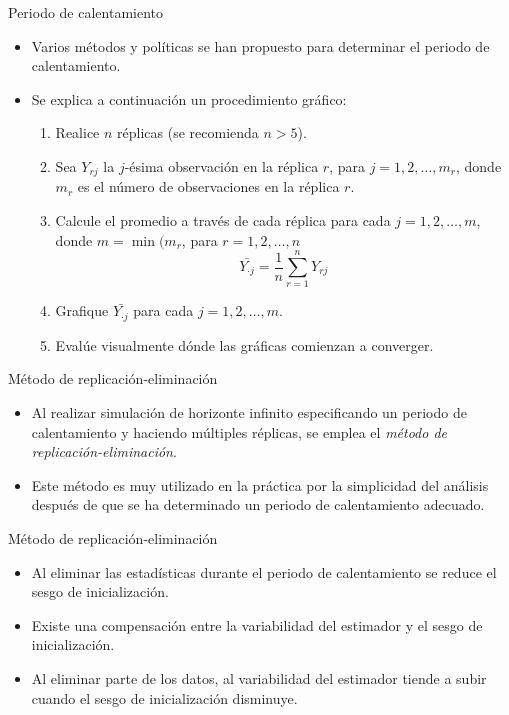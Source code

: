 \begin{frame}{Periodo de calentamiento}
    \begin{itemize}
        \item Varios métodos y políticas se han propuesto para determinar el periodo de calentamiento.
        \item Se explica a continuación un procedimiento gráfico:
            \begin{enumerate}
                \item Realice $n$ réplicas (se recomienda $n>5$).
                \item Sea $Y_{rj}$ la $j$-ésima observación en la réplica $r$, para $j=1,2,\dots,m_r$, donde $m_r$ es el número de observaciones en la réplica $r$.
                \item Calcule el promedio a través de cada réplica para cada $j=1,2,\dots,m$, donde $m=\min(m_r$, para $r=1,2,\dots,n$
                \[\bar{Y_{\cdot j}}=\frac{1}{n}\sum_{r=1}^{n}{Y_{rj}}\]
                \item Grafique $\bar{Y_{\cdot j}}$ para cada $j=1,2,\dots,m$.
                \item Evalúe visualmente dónde las gráficas comienzan a converger.
            \end{enumerate}
    \end{itemize}

\end{frame}

\begin{frame}{Método de replicación-eliminación}
    \begin{itemize}
        \item Al realizar simulación de horizonte infinito especificando un periodo de calentamiento y haciendo múltiples réplicas, se emplea el \textit{método de replicación-eliminación}.
        \item Este método es muy utilizado en la práctica por la simplicidad del análisis después de que se ha determinado un periodo de calentamiento adecuado.
    \end{itemize}
\end{frame}

\begin{frame}{Método de replicación-eliminación}
    \begin{itemize}
        \item Al eliminar las estadísticas durante el periodo de calentamiento se reduce el sesgo de inicialización.
        \item Existe una compensación entre la variabilidad del estimador y el sesgo de inicialización. 
        \item Al eliminar parte de los datos, al variabilidad del estimador tiende a subir cuando el sesgo de inicialización disminuye.
    \end{itemize}
\end{frame}
    
